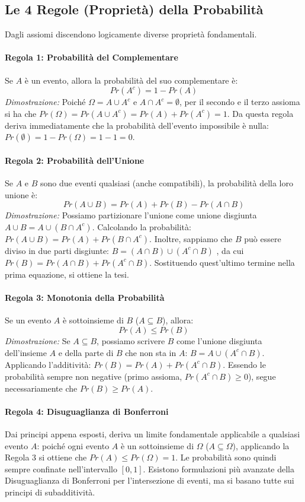 \documentclass[12pt, a4paper]{article}
\begin{document}
\subsection{Le 4 Regole (Proprietà) della Probabilità}
Dagli assiomi discendono logicamente diverse proprietà fondamentali.

\paragraph{Regola 1: Probabilità del Complementare}
Se $A$ è un evento, allora la probabilità del suo complementare è:
$$ Pr(A^c) = 1 - Pr(A) $$ 
\textit{Dimostrazione:} Poiché $\Omega = A \cup A^c$ e $A \cap A^c = \emptyset$, per il secondo e il terzo assioma si ha che $Pr(\Omega) = Pr(A \cup A^c) = Pr(A) + Pr(A^c) = 1$. Da questa regola deriva immediatamente che la probabilità dell'evento impossibile è nulla: $Pr(\emptyset) = 1 - Pr(\Omega) = 1 - 1 = 0$.

\paragraph{Regola 2: Probabilità dell'Unione}
Se $A$ e $B$ sono due eventi qualsiasi (anche compatibili), la probabilità della loro unione è:
$$ Pr(A \cup B) = Pr(A) + Pr(B) - Pr(A \cap B) $$ 
\textit{Dimostrazione:} Possiamo partizionare l'unione come unione disgiunta $A \cup B = A \cup (B \cap A^c)$. Calcolando la probabilità: $Pr(A \cup B) = Pr(A) + Pr(B \cap A^c)$. Inoltre, sappiamo che $B$ può essere diviso in due parti disgiunte: $B = (A \cap B) \cup (A^c \cap B)$ , da cui $Pr(B) = Pr(A \cap B) + Pr(A^c \cap B)$. Sostituendo quest'ultimo termine nella prima equazione, si ottiene la tesi.

\paragraph{Regola 3: Monotonia della Probabilità}
Se un evento $A$ è sottoinsieme di $B$ ($A \subseteq B$), allora:
$$ Pr(A) \le Pr(B) $$ 
\textit{Dimostrazione:} Se $A \subseteq B$, possiamo scrivere $B$ come l'unione disgiunta dell'insieme $A$ e della parte di $B$ che non sta in $A$: $B = A \cup (A^c \cap B)$. Applicando l'additività: $Pr(B) = Pr(A) + Pr(A^c \cap B)$. Essendo le probabilità sempre non negative (primo assioma, $Pr(A^c \cap B) \ge 0$), segue necessariamente che $Pr(B) \ge Pr(A)$.

\paragraph{Regola 4: Disuguaglianza di Bonferroni}
Dai principi appena esposti, deriva un limite fondamentale applicabile a qualsiasi evento $A$: poiché ogni evento $A$ è un sottoinsieme di $\Omega$ ($A \subseteq \Omega$), applicando la Regola 3 si ottiene che $Pr(A) \le Pr(\Omega) = 1$. Le probabilità sono quindi sempre confinate nell'intervallo $[0, 1]$. Esistono formulazioni più avanzate della Disuguaglianza di Bonferroni per l'intersezione di eventi, ma si basano tutte sui principi di subadditività.
\end{document}

